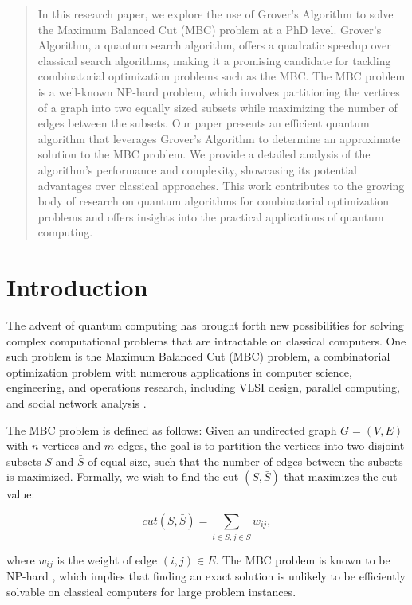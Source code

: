 \begin{abstract}
In this research paper, we explore the use of Grover's Algorithm to solve the Maximum Balanced Cut (MBC) problem at a PhD level. Grover's Algorithm, a quantum search algorithm, offers a quadratic speedup over classical search algorithms, making it a promising candidate for tackling combinatorial optimization problems such as the MBC. The MBC problem is a well-known NP-hard problem, which involves partitioning the vertices of a graph into two equally sized subsets while maximizing the number of edges between the subsets. Our paper presents an efficient quantum algorithm that leverages Grover's Algorithm to determine an approximate solution to the MBC problem. We provide a detailed analysis of the algorithm's performance and complexity, showcasing its potential advantages over classical approaches. This work contributes to the growing body of research on quantum algorithms for combinatorial optimization problems and offers insights into the practical applications of quantum computing.
\end{abstract}

\section{Introduction}
\label{sec:introduction}

The advent of quantum computing has brought forth new possibilities for solving complex computational problems that are intractable on classical computers. One such problem is the Maximum Balanced Cut (MBC) problem, a combinatorial optimization problem with numerous applications in computer science, engineering, and operations research, including VLSI design, parallel computing, and social network analysis \cite{mbc_applications}.

The MBC problem is defined as follows: Given an undirected graph $G = (V, E)$ with $n$ vertices and $m$ edges, the goal is to partition the vertices into two disjoint subsets $S$ and $\bar{S}$ of equal size, such that the number of edges between the subsets is maximized. Formally, we wish to find the cut $(S, \bar{S})$ that maximizes the cut value:

\begin{equation}
    \textit{cut}(S, \bar{S}) = \sum_{i \in S, j \in \bar{S}} w_{ij},
\end{equation}

\noindent where $w_{ij}$ is the weight of edge $(i, j) \in E$. The MBC problem is known to be NP-hard \cite{mbc_nphard}, which implies that finding an exact solution is unlikely to be efficiently solvable on classical computers for large problem instances.

